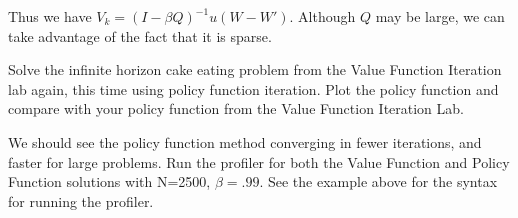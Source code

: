 Thus we have $V_k = (I-\beta Q)^{-1}u(W-W')$.  Although $Q$ may be large, we can take advantage of the fact that it is sparse. 

\begin{problem}
Solve the infinite horizon cake eating problem from the Value Function Iteration lab again, this time using policy function iteration.  Plot the policy function and compare with your policy function from the Value Function Iteration Lab.
\end{problem}

\begin{problem}
We should see the policy function method converging in fewer iterations, and faster for large problems.  Run the profiler for both the Value Function and Policy Function solutions with N=2500, $\beta = .99$.  See the example above for the syntax for running the profiler.
\end{problem}